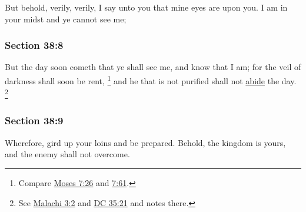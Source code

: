 		But behold, verily, verily, I say unto you that mine eyes are upon you. I am in your midst and ye cannot see me;


	\subsubsection{Section 38:8} %
		\label{DC38-8}

		But the day soon cometh that ye shall see me, and know that I am; for the veil of darkness shall soon be rent,%
			\footnote{%
				Compare \hyperref[MOSES-7-26]{Moses 7:26} and \hyperref[MOSES-7-61]{7:61}.
				}
		and he that is not purified shall not \hyperref[ABIDE]{abide} the day.%
		\footnote{%
			See \hyperref[MALACHI-3-2]{Malachi 3:2} and \hyperref[DC35-21]{DC 35:21} and notes there.
			} 


	\subsubsection{Section 38:9} %
		\label{DC38-9}

		Wherefore, gird up your loins and be prepared. Behold, the kingdom is yours, and the enemy shall not overcome.



